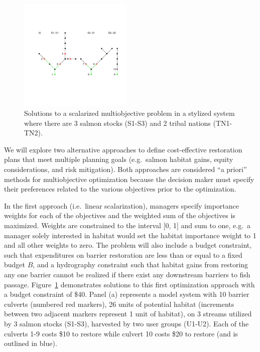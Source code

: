\documentclass[12pt]{elsarticle}
\begin{document}
\begin{figure}
\includegraphics[width=0.48\textwidth]{figures/opt_d.pdf} 
\caption{Solutions to a scalarized multiobjective problem in a stylized system where there are 3 salmon stocks (S1-S3) and 2 tribal nations (TN1-TN2). \label{fig:opt}}
\end{figure}%


We will explore two alternative approaches to define cost-effective restoration plans that meet multiple planning goals (e.g.\ salmon habitat gains, equity considerations, and risk mitigation). Both approaches are considered ``a priori'' methods for multiobjective optimization because the decision maker must specify their preferences related to the various objectives prior to the optimization. 

In the first approach (i.e.\ linear scalarization), managers specify importance weights for each of the objectives and the weighted sum of the objectives is maximized. Weights are constrained to the interval [0, 1] and sum to one, e.g.\ a manager solely interested in habitat would set the habitat importance weight to 1 and all other weights to zero. The problem will also include a budget constraint, such that expenditures on barrier restoration are less than or equal to a fixed budget $B$, and a hydrography constraint such that habitat gains from restoring any one barrier cannot be realized if there exist any downstream barriers to fish passage. Figure~\ref{fig:opt} demonstrates solutions to this first optimization approach with a budget constraint of \$40. Panel (a) represents a model system with 10 barrier culverts (numbered red markers), 26 units of potential habitat (increments between two adjacent markers represent 1 unit of habitat), on 3 streams utilized by 3 salmon stocks (S1-S3), harvested by two user groups (U1-U2). Each of the culverts 1-9 costs \$10 to restore while culvert 10 costs \$20 to restore (and is outlined in blue).
\end{document}
